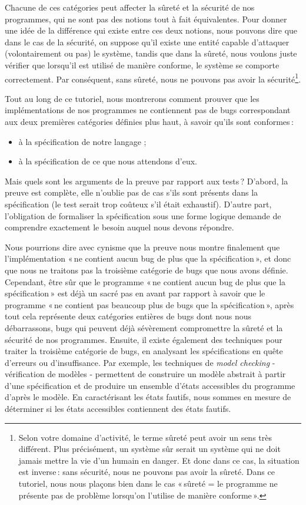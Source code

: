 Chacune de ces catégories peut affecter la sûreté et la sécurité de nos
programmes, qui ne sont pas des notions tout à fait équivalentes. Pour donner
une idée de la différence qui existe entre ces deux notions, nous pouvons
dire que dans le cas de la sécurité, on suppose qu’il existe une entité
capable d’attaquer (volontairement ou pas) le système, tandis que dans la
sûreté, nous voulons juste vérifier que lorsqu’il est utilisé de manière
conforme, le système se comporte correctement. Par conséquent, sans sûreté,
nous ne pouvons pas avoir la sécurité\footnote{Selon votre domaine
d’activité, le terme sûreté peut avoir un sens très différent. Plus
précisément, un système sûr serait un système qui ne doit jamais mettre la
vie d’un humain en danger. Et donc dans ce cas, la situation est inverse :
sans sécurité, nous ne pouvons pas avoir la sûreté. Dans ce tutoriel, nous
nous plaçons bien dans le cas « sûreté = le programme ne présente pas de
problème lorsqu’on l’utilise de manière conforme ».}.


Tout au long de ce tutoriel, nous montrerons comment prouver que les
implémentations de nos programmes ne contiennent pas de bugs correspondant
aux deux premières catégories définies plus haut, à savoir qu’ils sont
conformes :
\begin{itemize}
\item à la spécification de notre langage ;
\item à la spécification de ce que nous attendons d’eux.
\end{itemize}


Mais quels sont les arguments de la preuve par rapport aux tests ? D’abord,
la preuve est complète, elle n’oublie pas de cas s’ils sont présents dans la
spécification (le test serait trop coûteux s’il était exhaustif). D’autre
part, l’obligation de formaliser la spécification sous une forme logique
demande de comprendre exactement le besoin auquel nous devons répondre.

Nous pourrions dire avec cynisme que la preuve nous montre finalement que
l’implémentation « ne contient aucun bug de plus que la spécification », et
donc que nous ne traitons pas la troisième catégorie de bugs que nous avons
définie. Cependant, être sûr que le programme « ne contient aucun bug de
plus que la spécification » est déjà un sacré pas en avant par rapport à
savoir que le programme « ne contient pas beaucoup plus de bugs que la
spécification », après tout cela représente deux catégories entières de bugs
dont nous nous débarrassons, bugs qui peuvent déjà sévèrement compromettre la
sûreté et la sécurité de nos programmes. Ensuite, il existe également des
techniques pour traiter la troisième catégorie de bugs, en analysant les
spécifications en quête d’erreurs ou d’insuffisance. Par exemple, les
techniques de \emph{model checking} - vérification de modèles - permettent de
construire un modèle abstrait à partir d’une spécification et de produire
un ensemble d’états accessibles du programme d’après le modèle. En
caractérisant les états fautifs, nous sommes en mesure de déterminer si les
états accessibles contiennent des états fautifs.



